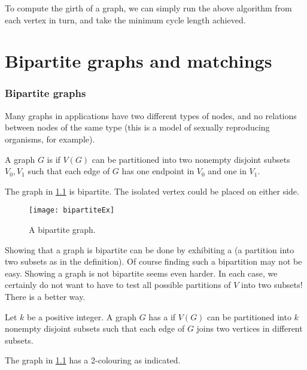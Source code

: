 To compute the girth of a graph, we can simply run the above algorithm
from each vertex in turn, and take the minimum cycle length achieved.

\chapter{Bipartite graphs and matchings}


\subsection{Bipartite graphs}
\label{subsec:bipartite}

Many graphs in applications have two different types of nodes, and no
relations between nodes of the same type (this is a model of sexually
reproducing organisms, for example).

\begin{Definition}
A graph $G$ is  if $V(G)$  can be partitioned into
two nonempty disjoint subsets $V_0, V_1$ such that each edge of $G$
has one endpoint in $V_0$ and one in $V_1$.
\end{Definition}

\begin{Example}
The graph in \cref{fig:bipartite} is bipartite.  The isolated
vertex could be placed on either side.
\end{Example}

\begin{figure}
\centering
\texttt{[image: bipartiteEx]} 
\caption{A bipartite graph.}
\label{fig:bipartite}
\end{figure}

Showing that a graph is bipartite can be done by exhibiting a
 (a partition into two subsets as in the
definition). Of course finding such a bipartition may not be easy. Showing
a graph is not bipartite seems even harder. In each case, we certainly
do not want to have to test all possible partitions of $V$ into two
subsets! There is a better way.

\begin{Definition}
Let $k$ be a positive integer. A graph $G$ has a 
if $V(G)$ can be partitioned into $k$ nonempty disjoint subsets such
that each edge of $G$ joins two vertices in different subsets.
\end{Definition}

\begin{Example}
The graph in \cref{fig:bipartite} has a 2-colouring as indicated.
\end{Example}

